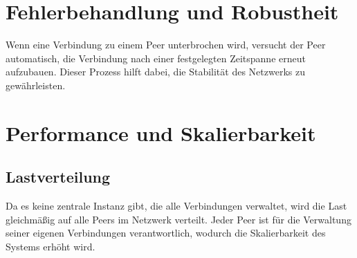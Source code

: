 \section{Fehlerbehandlung und Robustheit}

Wenn eine Verbindung zu einem Peer unterbrochen wird, versucht der Peer automatisch, die Verbindung nach einer festgelegten Zeitspanne erneut aufzubauen. Dieser Prozess hilft dabei, die Stabilität des Netzwerks zu gewährleisten.

\section{Performance und Skalierbarkeit}

\subsection{Lastverteilung}

Da es keine zentrale Instanz gibt, die alle Verbindungen verwaltet, wird die Last gleichmäßig auf alle Peers im Netzwerk verteilt. Jeder Peer ist für die Verwaltung seiner eigenen Verbindungen verantwortlich, wodurch die Skalierbarkeit des Systems erhöht wird.

\newpage
